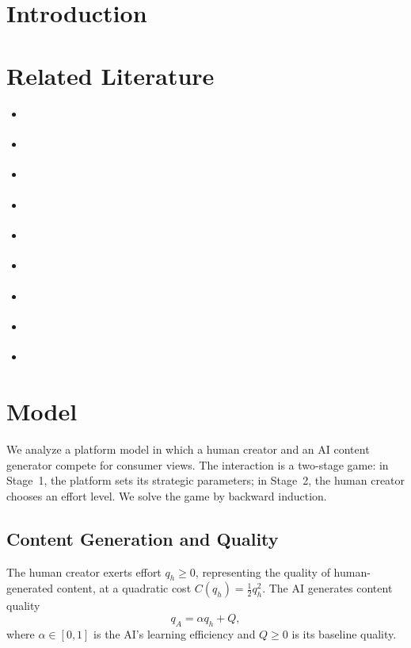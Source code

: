 \documentclass[mnsc,nonblindrev]{informs3_NoOR}
\begin{document}
\maketitle

\section{Introduction}

\section{Related Literature}
\begin{itemize}
\item \cite{ai_genai_2026}
\item \cite{esmaeili_how_2025}
\item \cite{taitler_braesss_2024}
\item \cite{taitler_data_2025}
\item \cite{taitler_selective_2025}
\item \cite{yao_rethinking_2023}
\item \cite{yao_human_2024}
\item \cite{yao_user_2024}
\item \cite{yu_beyond_2025}
\end{itemize}

\section{Model}
\label{sec:model}

We analyze a platform model in which a human creator and an AI content generator compete for consumer views. The interaction is a two-stage game: in Stage~1, the platform sets its strategic parameters; in Stage~2, the human creator chooses an effort level. We solve the game by backward induction.

\subsection{Content Generation and Quality}

The human creator exerts effort $q_h \ge 0$, representing the quality of human-generated content, at a quadratic cost $C(q_h) = \tfrac{1}{2}q_h^2$. The AI generates content quality
\begin{equation}
    q_A = \alpha q_h + Q,
    \label{eq:qA}
\end{equation}
where $\alpha \in [0,1]$ is the AI's learning efficiency and $Q \ge 0$ is its baseline quality.
\end{document}
